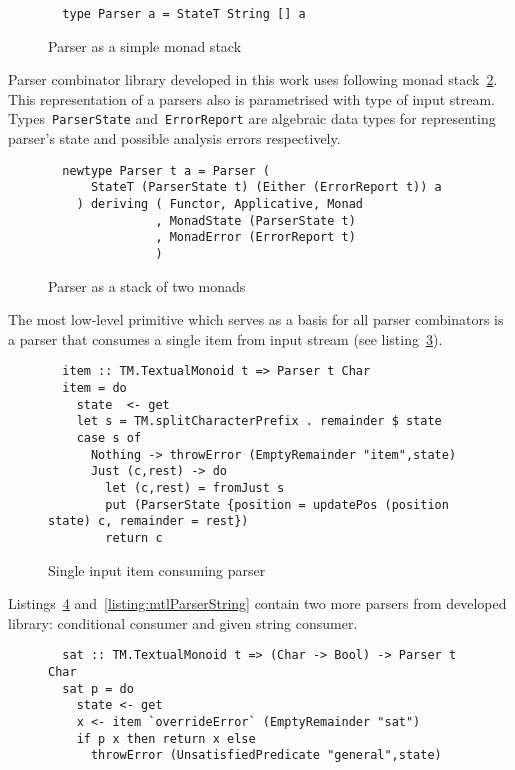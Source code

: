   \begin{figure}[h]
  \begin{lstlisting}
  type Parser a = StateT String [] a
  \end{lstlisting}
  \caption{Parser as a simple monad stack}
  \label{listing:monadStackParserType}
  \end{figure}

  Parser combinator library developed in this work uses following monad 
  stack~\ref{listing:hugeMonadStackParserType}. This representation of a 
  parsers also is parametrised with type of input stream. 
  Types~\lstinline{ParserState} and~\lstinline{ErrorReport} are algebraic
  data types for representing parser's state and possible analysis errors 
  respectively.

  \begin{figure}[h]
  \begin{lstlisting}
  newtype Parser t a = Parser (
      StateT (ParserState t) (Either (ErrorReport t)) a
    ) deriving ( Functor, Applicative, Monad
               , MonadState (ParserState t)
               , MonadError (ErrorReport t)
               )
  \end{lstlisting}
  \caption{Parser as a stack of two monads}
  \label{listing:hugeMonadStackParserType}
  \end{figure}

  The most low-level primitive which serves as a basis for all parser combinators 
  is a parser that consumes a single item from input stream 
  (see listing~\ref{listing:mtlParsersItem}).

  \begin{figure}[h]
  \begin{lstlisting}
  item :: TM.TextualMonoid t => Parser t Char
  item = do
    state  <- get
    let s = TM.splitCharacterPrefix . remainder $ state
    case s of
      Nothing -> throwError (EmptyRemainder "item",state)
      Just (c,rest) -> do
        let (c,rest) = fromJust s
        put (ParserState {position = updatePos (position state) c, remainder = rest})
        return c
  \end{lstlisting}
  \caption{Single input item consuming parser}
  \label{listing:mtlParsersItem}
  \end{figure}

  Listings~\ref{listing:mtlParserSat} and~\ref{listing:mtlParserString}
  contain two more parsers from developed library: conditional consumer and 
  given string consumer.

  \begin{figure}[h]
  \begin{lstlisting}
  sat :: TM.TextualMonoid t => (Char -> Bool) -> Parser t Char
  sat p = do
    state <- get
    x <- item `overrideError` (EmptyRemainder "sat")
    if p x then return x else
      throwError (UnsatisfiedPredicate "general",state)
  \end{lstlisting}
  \caption{}
  \label{listing:mtlParserSat}
  \end{figure}

